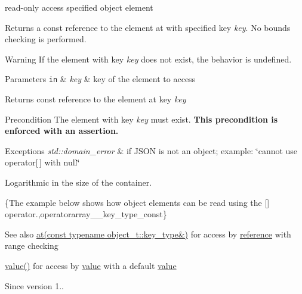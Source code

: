 read-\/only access specified object element 

Returns a const reference to the element at with specified key {\itshape key}. No bounds checking is performed.

\begin{DoxyWarning}{Warning}
If the element with key {\itshape key} does not exist, the behavior is undefined.
\end{DoxyWarning}

\begin{DoxyParams}[1]{Parameters}
\mbox{\tt in}  & {\em key} & key of the element to access\\
\hline
\end{DoxyParams}
\begin{DoxyReturn}{Returns}
const reference to the element at key {\itshape key} 
\end{DoxyReturn}
\begin{DoxyPrecond}{Precondition}
The element with key {\itshape key} must exist. {\bfseries This precondition is enforced with an assertion.}
\end{DoxyPrecond}

\begin{DoxyExceptions}{Exceptions}
{\em std\+::domain\+\_\+error} & if J\+S\+O\+N is not an object; example\+: {\ttfamily \char`\"{}cannot use
operator\mbox{[}$\,$\mbox{]} with null\char`\"{}}\\
\hline
\end{DoxyExceptions}
Logarithmic in the size of the container.

\{The example below shows how object elements can be read using the {\ttfamily \mbox{[}\mbox{]}} operator.,operatorarray\+\_\+\+\_\+key\+\_\+type\+\_\+const\}

\begin{DoxySeeAlso}{See also}
\hyperlink{classnlohmann_1_1basic__json_a7ed92d56cb313b243c1917696ffdf074}{at(const typename object\+\_\+t\+::key\+\_\+type\&)} for access by \hyperlink{classnlohmann_1_1basic__json_a3ec8e17be8732fe436e9d6733f52b7a3}{reference} with range checking 

\hyperlink{classnlohmann_1_1basic__json_a0a2cbbd95862a623e7dc5c37e67dead0}{value()} for access by \hyperlink{classnlohmann_1_1basic__json_a0a2cbbd95862a623e7dc5c37e67dead0}{value} with a default \hyperlink{classnlohmann_1_1basic__json_a0a2cbbd95862a623e7dc5c37e67dead0}{value}
\end{DoxySeeAlso}
\begin{DoxySince}{Since}
version 1.. 
\end{DoxySince}


